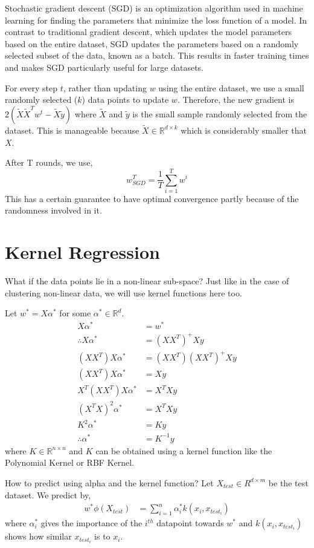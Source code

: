 \documentclass[
]{article}
\begin{document}
Stochastic gradient descent (SGD) is an optimization algorithm used in
machine learning for finding the parameters that minimize the loss
function of a model. In contrast to traditional gradient descent, which
updates the model parameters based on the entire dataset, SGD updates
the parameters based on a randomly selected subset of the data, known as
a batch. This results in faster training times and makes SGD
particularly useful for large datasets.

For every step \(t\), rather than updating \(w\) using the entire
dataset, we use a small randomly selected (\(k\)) data points to update
\(w\). Therefore, the new gradient is
\(2(\tilde{X}\tilde{X}^Tw^t - \tilde{X}\tilde{y})\) where \(\tilde{X}\)
and \(\tilde{y}\) is the small sample randomly selected from the
dataset. This is manageable because
\(\tilde{X} \in \mathbb{R}^{d \times k}\) which is considerably smaller
that \(X\).

After T rounds, we use, \[
w ^T _{SGD} = \frac{1}{T}  \sum _{i=1} ^T w^i
\] This has a certain guarantee to have optimal convergence partly
because of the randomness involved in it.

\hypertarget{kernel-regression}{%
\section{Kernel Regression}\label{kernel-regression}}

What if the data points lie in a non-linear sub-space? Just like in the
case of clustering non-linear data, we will use kernel functions here
too.

Let \(w^* = X\alpha^*\) for some \(\alpha^* \in \mathbb{R}^d\).
\begin{align*}
X\alpha^*&=w^*\\
\therefore X\alpha^* &=(XX^T)^+Xy \\
(XX^T)X\alpha^* &=(XX^T)(XX^T)^+Xy \\
(XX^T)X\alpha^* &=Xy \\
X^T(XX^T)X\alpha^* &=X^TXy \\
(X^TX)^2\alpha^* &=X^TXy \\
K^2\alpha^* &=Ky \\
\therefore \alpha^* &=K^{-1}y
\end{align*} where \(K \in \mathbb{R}^{n \times n}\) and \(K\) can be
obtained using a kernel function like the Polynomial Kernel or RBF
Kernel.

How to predict using alpha and the kernel function? Let
\(X_{test} \in R^{d \times m}\) be the test dataset. We predict by,
\begin{align*}
w^*\phi(X_{test}) &=  \sum _{i=1} ^n \alpha_i^* k(x_i, x_{test_i})
\end{align*} where \(\alpha_i^*\) gives the importance of the \(i^{th}\)
datapoint towards \(w^*\) and \(k(x_i, x_{test_i})\) shows how similar
\(x_{test_i}\) is to \(x_i\).
\end{document}
